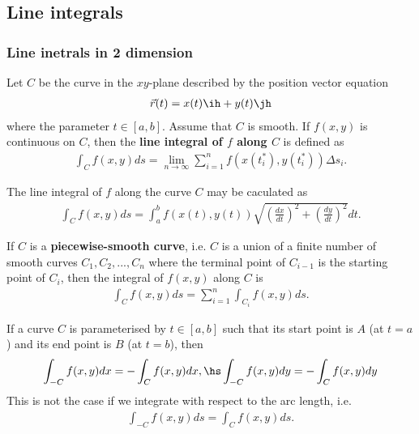\documentclass{article}
\begin{document}
\subsection{Line integrals}


\subsubsection{Line inetrals in 2 dimension}

\begin{definition}
    Let $C$ be the curve in the $xy$-plane described by the position vector equation
    \begin{align*}
        \vec r(t) = x(t)\ih + y(t)\jh
    \end{align*}
    where the parameter $t\in[a,b]$. Assume that $C$ is smooth.
    If $f(x,y)$ is continuous on $C$, then the \textbf{line integral of $f$ along $C$} is
    defined as
    \begin{align*}
        \int_C f(x,y) ds = \lim_{n\to\infty} \sum_{i=1}^n f(x(t_i^*), y(t_i^*))\Delta s_i.
    \end{align*}
\end{definition}
\begin{theorem}
    The line integral of $f$ along the curve $C$ may be caculated as
    \begin{align*}
        \int_C f(x,y)ds = \int_a^b f(x(t), y(t))\sqrt{\left(\frac{dx}{dt}\right)^2 +
            \left(\frac{dy}{dt}\right)^2}dt.
    \end{align*}
\end{theorem}
\begin{theorem}
    If $C$ is a \textbf{piecewise-smooth curve}, i.e. $C$ is a union of a finite number of smooth
    curves $C_1, C_2, ..., C_n$ where the terminal point of $C_{i-1}$ is the starting point
    of $C_i$, then the integral of $f(x,y)$ along $C$ is
    \begin{align*}
        \int_C f(x,y)ds = \sum_{i=1}^n \int_{C_i} f(x,y)ds.
    \end{align*}
\end{theorem}
\begin{lemma}
    If a curve $C$ is parameterised by $t\in[a,b]$ such that its start point is $A$
    (at $t=a$) and its end point is $B$ (at $t=b$), then
    \begin{align*}
        \int_{-C} f(x,y)dx = -\int_C f(x,y)dx,\hs
        \int_{-C}f(x,y)dy = -\int_C f(x,y)dy
    \end{align*}
    This is not the case if we integrate with respect to the arc length, i.e.
    \begin{align*}
        \int_{-C}f(x,y)ds = \int_C f(x,y)ds.
    \end{align*}
\end{lemma}
\end{document}
